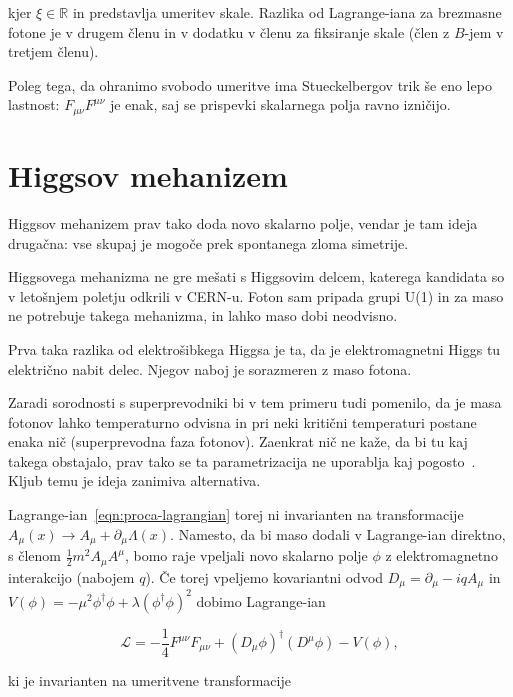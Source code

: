 \documentclass[a4paper, twocolumn, titlepage]{article}
\begin{document}
kjer $\xi \in \mathbb{R}$ in predstavlja umeritev skale. Razlika od Lagrange-iana za brezmasne fotone je v drugem
\v clenu in v dodatku v \v clenu za fiksiranje skale (\v clen z $B$-jem v tretjem \v clenu).

Poleg tega, da ohranimo svobodo umeritve ima Stueckelbergov trik \v se eno lepo lastnost: $F_{\mu\nu} F^{\mu\nu}$ je enak,
saj se prispevki skalarnega polja ravno izni\v cijo.

\section{Higgsov mehanizem}

Higgsov mehanizem prav tako doda novo skalarno polje, vendar je tam ideja druga\v cna: vse skupaj je mogo\v ce prek
spontanega zloma simetrije.

Higgsovega mehanizma ne gre me\v sati s Higgsovim delcem, katerega kandidata so v leto\v snjem poletju odkrili v CERN-u.
Foton sam pripada grupi U(1) in za maso ne potrebuje takega mehanizma, in lahko maso dobi neodvisno.

Prva taka razlika od elektro\v sibkega Higgsa je ta, da je elektromagnetni Higgs tu elektri\v cno nabit delec. Njegov
naboj je sorazmeren z maso fotona.

Zaradi sorodnosti s superprevodniki bi v tem primeru tudi pomenilo, da je masa fotonov lahko temperaturno odvisna in pri
neki kriti\v cni temperaturi postane enaka ni\v c (superprevodna faza fotonov). Zaenkrat nič ne kaže, da bi tu kaj takega obstajalo, prav tako
se ta parametrizacija ne uporablja kaj pogosto~\cite{nieto2}. Kljub temu je ideja zanimiva alternativa.

Lagrange-ian~\eqref{eqn:proca-lagrangian} torej ni invarianten na transformacije $A_\mu (x) \to A_\mu + \partial_\mu\Lambda(x)$.
Namesto, da bi maso dodali v Lagrange-ian direktno, s členom $\frac{1}{2}m^2 A_\mu A^\mu$, bomo raje vpeljali novo skalarno polje $\phi$ z 
elektromagnetno interakcijo (nabojem $q$). Če torej vpeljemo kovariantni odvod $D_\mu = \partial_\mu - iqA_\mu$ in
$V(\phi) = -\mu^2 \phi^\dagger\phi + \lambda(\phi^\dagger\phi)^2$ dobimo Lagrange-ian

\begin{equation}
	\mathcal{L} = -\frac{1}{4}F^{\mu\nu}F_{\mu\nu} + (D_\mu\phi)^\dagger(D^\mu\phi) - V(\phi),
	\label{eqn:higgs-lagrangian1}
\end{equation}

ki je invarianten na umeritvene transformacije
\end{document}
